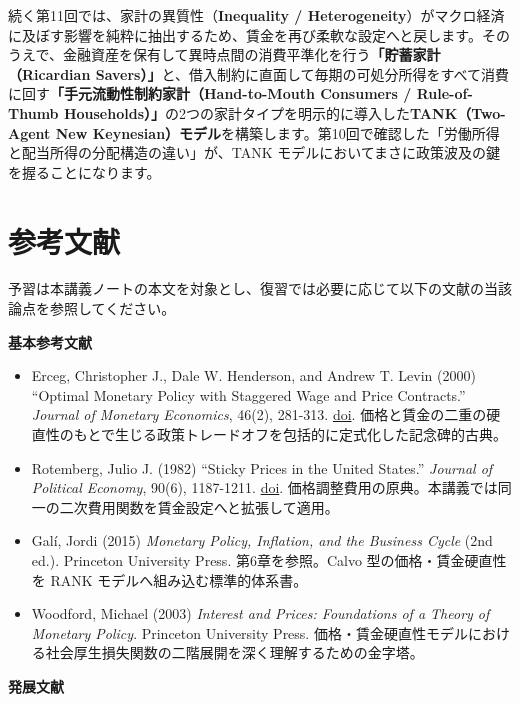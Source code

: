 \documentclass[
  japanese,
  lualatex,
  ja=standard,
  12pt,
  a4paper]{ltjsarticle}
\providecommand{\tightlist}{%
  \setlength{\itemsep}{0pt}\setlength{\parskip}{0pt}}
\begin{document}
続く第11回では、家計の異質性（\textbf{Inequality /
Heterogeneity}）がマクロ経済に及ぼす影響を純粋に抽出するため、賃金を再び柔軟な設定へと戻します。そのうえで、金融資産を保有して異時点間の消費平準化を行う\textbf{「貯蓄家計（Ricardian
Savers）」}と、借入制約に直面して毎期の可処分所得をすべて消費に回す\textbf{「手元流動性制約家計（Hand-to-Mouth
Consumers / Rule-of-Thumb
Households）」}の2つの家計タイプを明示的に導入した\textbf{TANK（Two-Agent
New
Keynesian）モデル}を構築します。第10回で確認した「労働所得と配当所得の分配構造の違い」が、TANK
モデルにおいてまさに政策波及の鍵を握ることになります。

\Needspace{0.35\textheight}

\section{参考文献}\label{ux53c2ux8003ux6587ux732e}

予習は本講義ノートの本文を対象とし、復習では必要に応じて以下の文献の当該論点を参照してください。

\textbf{基本参考文献}

\begin{itemize}
\tightlist
\item
  Erceg, Christopher J., Dale W. Henderson, and Andrew T. Levin (2000)
  ``Optimal Monetary Policy with Staggered Wage and Price Contracts.''
  \emph{Journal of Monetary Economics}, 46(2), 281-313.
  \href{https://doi.org/10.1016/S0304-3932(00)00028-3}{doi}.
  価格と賃金の二重の硬直性のもとで生じる政策トレードオフを包括的に定式化した記念碑的古典。
\item
  Rotemberg, Julio J. (1982) ``Sticky Prices in the United States.''
  \emph{Journal of Political Economy}, 90(6), 1187-1211.
  \href{https://doi.org/10.1086/261117}{doi}.
  価格調整費用の原典。本講義では同一の二次費用関数を賃金設定へと拡張して適用。
\item
  Galí, Jordi (2015) \emph{Monetary Policy, Inflation, and the Business
  Cycle} (2nd ed.). Princeton University Press. 第6章を参照。Calvo
  型の価格・賃金硬直性を RANK モデルへ組み込む標準的体系書。
\item
  Woodford, Michael (2003) \emph{Interest and Prices: Foundations of a
  Theory of Monetary Policy}. Princeton University Press.
  価格・賃金硬直性モデルにおける社会厚生損失関数の二階展開を深く理解するための金字塔。
\end{itemize}

\newpage

\textbf{発展文献}
\end{document}
